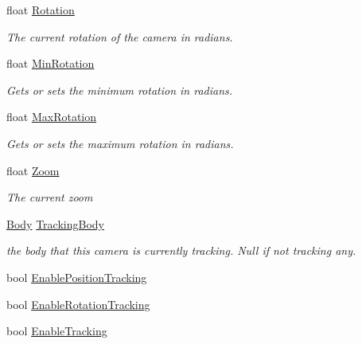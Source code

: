 \begin{DoxyCompactItemize}
float \hyperlink{classgearit_1_1xna_1_1_camera2_d_a17b022dbd270f8e9e6ac8782b3b564d0}{Rotation}
\begin{DoxyCompactList}\small\item\em The current rotation of the camera in radians. \end{DoxyCompactList}\item 
float \hyperlink{classgearit_1_1xna_1_1_camera2_d_ab31e75d2cc35168c1ad65431e66cbaf2}{Min\+Rotation}
\begin{DoxyCompactList}\small\item\em Gets or sets the minimum rotation in radians. \end{DoxyCompactList}\item 
float \hyperlink{classgearit_1_1xna_1_1_camera2_d_a3fad18af294799d0e9d703141494f07d}{Max\+Rotation}
\begin{DoxyCompactList}\small\item\em Gets or sets the maximum rotation in radians. \end{DoxyCompactList}\item 
float \hyperlink{classgearit_1_1xna_1_1_camera2_d_a3f3ff729da5335b0462906a6aceb928b}{Zoom}
\begin{DoxyCompactList}\small\item\em The current zoom \end{DoxyCompactList}\item 
\hyperlink{class_farseer_physics_1_1_dynamics_1_1_body}{Body} \hyperlink{classgearit_1_1xna_1_1_camera2_d_a548949adba5873377df08185b72b930f}{Tracking\+Body}
\begin{DoxyCompactList}\small\item\em the body that this camera is currently tracking. Null if not tracking any. \end{DoxyCompactList}\item 
bool \hyperlink{classgearit_1_1xna_1_1_camera2_d_adb9590e73552a7f2ed9119a5ab417a7d}{Enable\+Position\+Tracking}
\item 
bool \hyperlink{classgearit_1_1xna_1_1_camera2_d_a377d82e34f9c49cabf863a366898de76}{Enable\+Rotation\+Tracking}
\item 
bool \hyperlink{classgearit_1_1xna_1_1_camera2_d_a8bc2cab6731a06280859bf2219505dc8}{Enable\+Tracking}
\end{DoxyCompactItemize}


